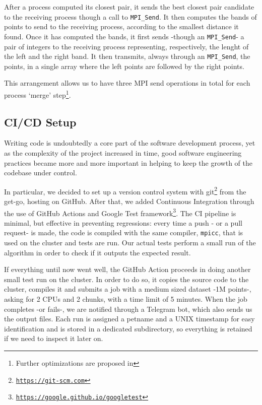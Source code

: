After a process computed its closest pair, it sends the best closest pair candidate to the receiving process though a call to \verb|MPI_Send|. It then computes the bands of points to send to the receiving process, according to the smallest distance it found. Once it has computed the bands, it first sends -though an \verb|MPI_Send|- a pair of integers to the receiving process representing, respectively, the lenght of the left and the right band. It then transmits, always through an \verb|MPI_Send|, the points, in a single array where the left points are followed by the right points.

\noindent
This arrangement allows us to have three MPI send operations in total for each process `merge' step\footnote{Further optimizations are proposed in }.

\subsection{CI/CD Setup}

Writing code is undoubtedly a core part of the software development process, yet as the complexity of the project increased in time, good software engineering practices became more and more important in helping to keep the growth of the codebase under control.

In particular, we decided to set up a version control system with git\footnote{\texttt{\url{https://git-scm.com}}} from the get-go, hosting on GitHub. After that, we added Continuous Integration through the use of GitHub Actions and Google Test framework\footnote{\texttt{\url{https://google.github.io/googletest}}}. The CI pipeline is minimal, but effective in preventing regressions: every time a push - or a pull request- is made, the code is compiled with the same compiler, \verb|mpicc|, that is used on the cluster and tests are run. Our actual tests perform a small run of the algorithm in order to check if it outputs the expected result.

If everything until now went well, the GitHub Action proceeds in doing another small test run on the cluster. In order to do so, it copies the source code to the cluster, compiles it and submits a job with a medium sized dataset -1M \mbox{points-,} asking for 2 CPUs and 2 chunks, with a time limit of 5 minutes. When the job completes -or fails-, we are notified through a Telegram bot, which also sends us the output files.
Each run is assigned a petname \cite{ferdous2009petnames} and a UNIX timestamp for easy identification and is stored in a dedicated subdirectory, so everything is retained if we need to inspect it later on.

